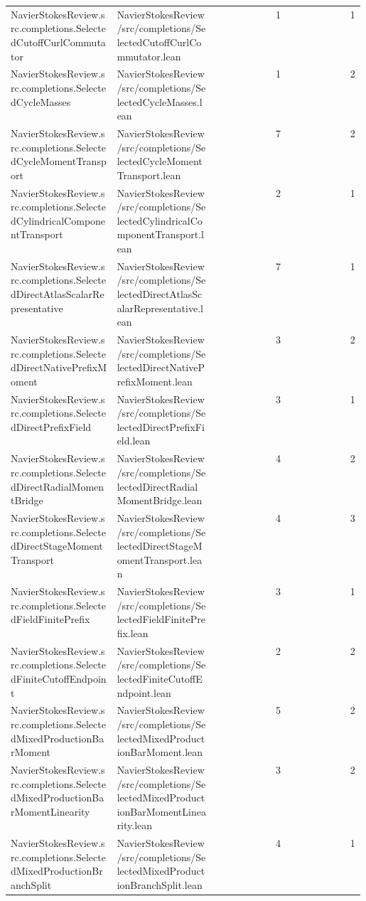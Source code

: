 \begin{longtable}{p{0.30\linewidth}p{0.28\linewidth}rr}
NavierStokesReview.src.completions.SelectedCutoffCurlCommutator & NavierStokesReview/src/completions/SelectedCutoffCurlCommutator.lean & 1 & 1\\
NavierStokesReview.src.completions.SelectedCycleMasses & NavierStokesReview/src/completions/SelectedCycleMasses.lean & 1 & 2\\
NavierStokesReview.src.completions.SelectedCycleMomentTransport & NavierStokesReview/src/completions/SelectedCycleMomentTransport.lean & 7 & 2\\
NavierStokesReview.src.completions.SelectedCylindricalComponentTransport & NavierStokesReview/src/completions/SelectedCylindricalComponentTransport.lean & 2 & 1\\
NavierStokesReview.src.completions.SelectedDirectAtlasScalarRepresentative & NavierStokesReview/src/completions/SelectedDirectAtlasScalarRepresentative.lean & 7 & 1\\
NavierStokesReview.src.completions.SelectedDirectNativePrefixMoment & NavierStokesReview/src/completions/SelectedDirectNativePrefixMoment.lean & 3 & 2\\
NavierStokesReview.src.completions.SelectedDirectPrefixField & NavierStokesReview/src/completions/SelectedDirectPrefixField.lean & 3 & 1\\
NavierStokesReview.src.completions.SelectedDirectRadialMomentBridge & NavierStokesReview/src/completions/SelectedDirectRadialMomentBridge.lean & 4 & 2\\
NavierStokesReview.src.completions.SelectedDirectStageMomentTransport & NavierStokesReview/src/completions/SelectedDirectStageMomentTransport.lean & 4 & 3\\
NavierStokesReview.src.completions.SelectedFieldFinitePrefix & NavierStokesReview/src/completions/SelectedFieldFinitePrefix.lean & 3 & 1\\
NavierStokesReview.src.completions.SelectedFiniteCutoffEndpoint & NavierStokesReview/src/completions/SelectedFiniteCutoffEndpoint.lean & 2 & 2\\
NavierStokesReview.src.completions.SelectedMixedProductionBarMoment & NavierStokesReview/src/completions/SelectedMixedProductionBarMoment.lean & 5 & 2\\
NavierStokesReview.src.completions.SelectedMixedProductionBarMomentLinearity & NavierStokesReview/src/completions/SelectedMixedProductionBarMomentLinearity.lean & 3 & 2\\
NavierStokesReview.src.completions.SelectedMixedProductionBranchSplit & NavierStokesReview/src/completions/SelectedMixedProductionBranchSplit.lean & 4 & 1\\

\end{longtable}
